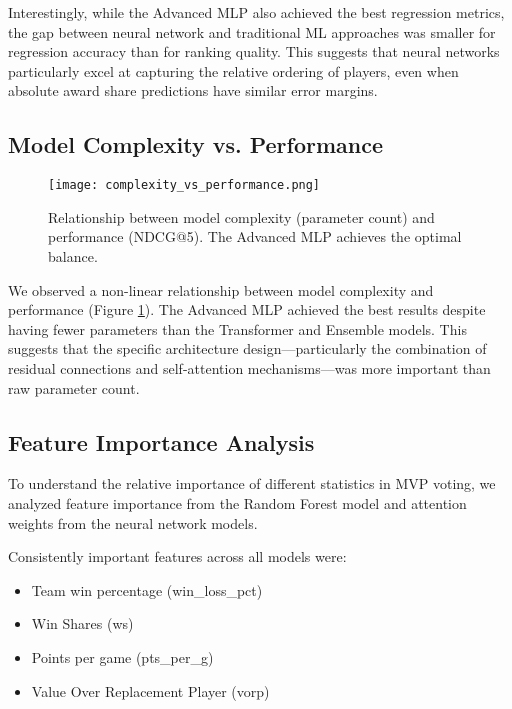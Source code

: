 \documentclass[10pt,twocolumn,letterpaper]{article}
\begin{document}
Interestingly, while the Advanced MLP also achieved the best regression metrics, the gap between neural network and traditional ML approaches was smaller for regression accuracy than for ranking quality. This suggests that neural networks particularly excel at capturing the relative ordering of players, even when absolute award share predictions have similar error margins.

\subsection{Model Complexity vs. Performance}

\begin{figure}[t]
\begin{center}
\texttt{[image: complexity\_vs\_performance.png]}
\end{center}
\caption{Relationship between model complexity (parameter count) and performance (NDCG@5). The Advanced MLP achieves the optimal balance.}
\label{fig:complexity_performance}
\end{figure}

We observed a non-linear relationship between model complexity and performance (Figure \ref{fig:complexity_performance}). The Advanced MLP achieved the best results despite having fewer parameters than the Transformer and Ensemble models. This suggests that the specific architecture design—particularly the combination of residual connections and self-attention mechanisms—was more important than raw parameter count.

\subsection{Feature Importance Analysis}

To understand the relative importance of different statistics in MVP voting, we analyzed feature importance from the Random Forest model and attention weights from the neural network models.

Consistently important features across all models were:
\begin{itemize}
    \item Team win percentage (win\_loss\_pct)
    \item Win Shares (ws)
    \item Points per game (pts\_per\_g)
    \item Value Over Replacement Player (vorp)
\end{itemize}
\end{document}
